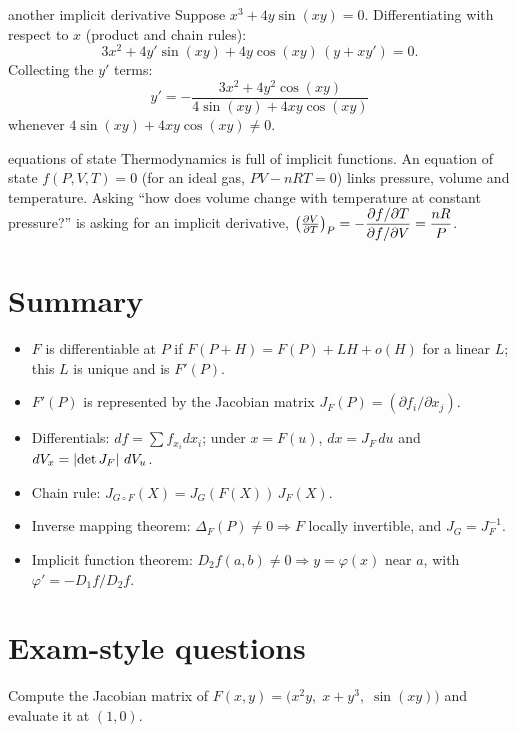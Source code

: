 \begin{example}{another implicit derivative}
Suppose $x^3+4y\sin(xy)=0$. Differentiating with respect to $x$ (product and chain rules):
\[ 3x^2+4y'\sin(xy)+4y\cos(xy)\,(y+xy')=0 . \]
Collecting the $y'$ terms:
\[ y'=-\frac{3x^2+4y^2\cos(xy)}{4\sin(xy)+4xy\cos(xy)} \]
whenever $4\sin(xy)+4xy\cos(xy)\neq0$.
\end{example}

\begin{reallife}{equations of state}
Thermodynamics is full of implicit functions. An equation of state $f(P,V,T)=0$ (for an ideal gas,
$PV-nRT=0$) links pressure, volume and temperature. Asking ``how does volume change with
temperature at constant pressure?'' is asking for an implicit derivative,
$\left(\frac{\partial V}{\partial T}\right)_P=-\dfrac{\partial f/\partial T}{\partial f/\partial V}=\dfrac{nR}{P}$.
\end{reallife}

\section{Summary}

\begin{keyidea}
\begin{itemize}
  \item $F$ is differentiable at $P$ if $F(P+H)=F(P)+LH+o(H)$ for a linear $L$; this $L$ is unique and is $F'(P)$.
  \item $F'(P)$ is represented by the Jacobian matrix $J_F(P)=(\partial f_i/\partial x_j)$.
  \item Differentials: $df=\sum f_{x_i}dx_i$; under $x=F(u)$, $dx=J_F\,du$ and
  $dV_x=\left\lvert \det J_F\right\rvert\,dV_u$.
  \item Chain rule: $J_{G\circ F}(X)=J_G(F(X))\,J_F(X)$.
  \item Inverse mapping theorem: $\Delta_F(P)\neq0\Rightarrow F$ locally invertible, and $J_G=J_F^{-1}$.
  \item Implicit function theorem: $D_2f(a,b)\neq0\Rightarrow y=\varphi(x)$ near $a$, with $\varphi'=-D_1f/D_2f$.
\end{itemize}
\end{keyidea}

\section{Exam-style questions}

\begin{exercise}[1]
Compute the Jacobian matrix of $F(x,y)=\big(x^2y,\;x+y^3,\;\sin(xy)\big)$ and evaluate it at $(1,0)$.
\end{exercise}

